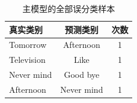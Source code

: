 \begin{table}[htbp]\centering
\caption{主模型的全部误分类样本}
\label{tab:errors}
\begin{tabular}{lcc}
\toprule
真实类别 & 预测类别 & 次数 \\
\midrule
Tomorrow & Afternoon & 1 \\
Television & Like & 1 \\
Never mind & Good bye & 1 \\
Afternoon & Never mind & 1 \\
\bottomrule
\end{tabular}
\end{table}
